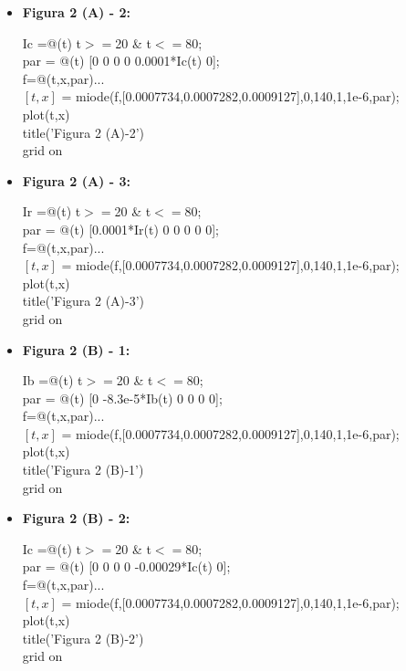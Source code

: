 \documentclass[a4paper]{article}
\begin{document}
\begin{itemize}
	
	\item \textbf{Figura 2 (A) - 2:}
	\begin{tabbing}
		Ic =@(t) t$>=$20 \& t$<=$80;\\
		par = @(t) [0 0 0 0 0.0001*Ic(t) 0];\\
		f=@(t,x,par)...\\
		$[t,x]$ = miode(f,[0.0007734,0.0007282,0.0009127],0,140,1,1e-6,par);\\
		plot(t,x)\\
		title('Figura 2 (A)-2')\\
		grid on\\
	\end{tabbing}
	
	\item \textbf{Figura 2 (A) - 3:}
	\begin{tabbing}
		Ir =@(t) t$>=$20 \& t$<=$80;\\
		par = @(t) [0.0001*Ir(t) 0 0 0 0 0];\\
		f=@(t,x,par)...\\
		$[t,x]$ = miode(f,[0.0007734,0.0007282,0.0009127],0,140,1,1e-6,par);\\
		plot(t,x)\\
		title('Figura 2 (A)-3')\\
		grid on\\
	\end{tabbing}
	
	\item \textbf{Figura 2 (B) - 1:}
	\begin{tabbing}
		Ib =@(t) t$>=$20 \& t$<=$80;\\
		par = @(t) [0 -8.3e-5*Ib(t) 0 0 0 0];\\
		f=@(t,x,par)...\\
		$[t,x]$ = miode(f,[0.0007734,0.0007282,0.0009127],0,140,1,1e-6,par);\\
		plot(t,x)\\
		title('Figura 2 (B)-1')\\
		grid on\\
	\end{tabbing}
	
	\item \textbf{Figura 2 (B) - 2:}
	\begin{tabbing}
		Ic =@(t) t$>=$20 \& t$<=$80;\\
		par = @(t) [0 0 0 0 -0.00029*Ic(t) 0];\\
		f=@(t,x,par)...\\
		$[t,x]$ = miode(f,[0.0007734,0.0007282,0.0009127],0,140,1,1e-6,par);\\
		plot(t,x)\\
		title('Figura 2 (B)-2')\\
		grid on\\
	\end{tabbing}
	

\end{itemize}
\end{document}
